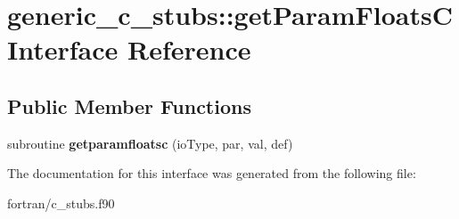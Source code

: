 \hypertarget{interfacegeneric__c__stubs_1_1get_param_floats_c}{}\section{generic\+\_\+c\+\_\+stubs\+:\+:get\+Param\+FloatsC Interface Reference}
\label{interfacegeneric__c__stubs_1_1get_param_floats_c}
\subsection*{Public Member Functions}
\begin{DoxyCompactItemize}
\item 
\mbox{\label{interfacegeneric__c__stubs_1_1get_param_floats_c_ae1f558e6e3c8b831ad027e7dbe6d011c}} 
subroutine {\bfseries getparamfloatsc} (io\+Type, par, val, def)
\end{DoxyCompactItemize}


The documentation for this interface was generated from the following file\+:\begin{DoxyCompactItemize}
\item 
fortran/c\+\_\+stubs.\+f90\end{DoxyCompactItemize}
